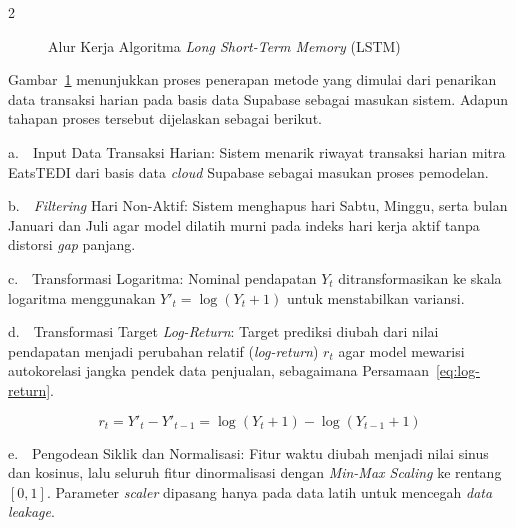 \documentclass[12pt, a4paper, onecolumn, oneside]{report}
\begin{document}
\begin{spacing}{2}
\begin{figure}[H]
{%
    }
    \caption{Alur Kerja Algoritma \textit{Long Short-Term Memory} (LSTM)}
    \label{fig:lstm_alur}
\end{figure}

Gambar~\ref{fig:lstm_alur} menunjukkan proses penerapan metode yang dimulai dari penarikan data transaksi harian pada basis data Supabase sebagai masukan sistem. Adapun tahapan proses tersebut dijelaskan sebagai berikut.

\noindent a.~~Input Data Transaksi Harian: Sistem menarik riwayat transaksi harian mitra EatsTEDI dari basis data \textit{cloud} Supabase sebagai masukan proses pemodelan.

\noindent b.~~\textit{Filtering} Hari Non-Aktif: Sistem menghapus hari Sabtu, Minggu, serta bulan Januari dan Juli agar model dilatih murni pada indeks hari kerja aktif tanpa distorsi \textit{gap} panjang.

\noindent c.~~Transformasi Logaritma: Nominal pendapatan $Y_t$ ditransformasikan ke skala logaritma menggunakan $Y'_t = \log(Y_t + 1)$ untuk menstabilkan variansi.

\noindent d.~~Transformasi Target \textit{Log-Return}: Target prediksi diubah dari nilai pendapatan menjadi perubahan relatif (\textit{log-return}) $r_t$ agar model mewarisi autokorelasi jangka pendek data penjualan, sebagaimana Persamaan~\ref{eq:log-return}.

\begin{equation}
    r_t = Y'_t - Y'_{t-1} = \log(Y_t + 1) - \log(Y_{t-1} + 1)
    \label{eq:log-return}
\end{equation}

\noindent e.~~Pengodean Siklik dan Normalisasi: Fitur waktu diubah menjadi nilai sinus dan kosinus, lalu seluruh fitur dinormalisasi dengan \textit{Min-Max Scaling} ke rentang $[0,1]$. Parameter \textit{scaler} dipasang hanya pada data latih untuk mencegah \textit{data leakage}.


\end{spacing}
\end{document}

